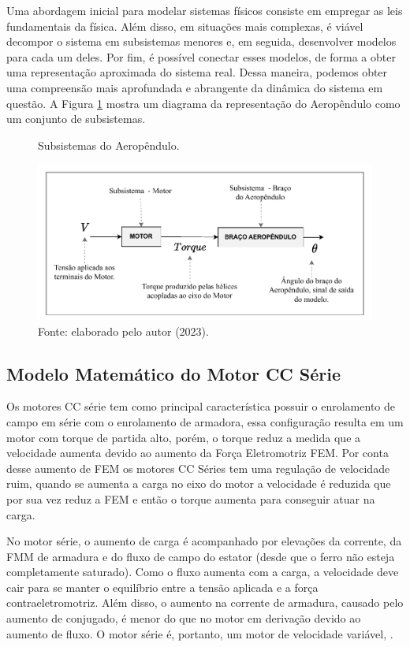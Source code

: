 


Uma abordagem inicial para modelar sistemas físicos consiste em empregar as leis fundamentais da física. Além disso, em situações mais complexas, é viável decompor o sistema em subsistemas menores e, em seguida, desenvolver modelos para cada um deles. Por fim, é possível conectar esses modelos, de forma a obter uma representação aproximada do sistema real. Dessa maneira, podemos obter uma compreensão mais aprofundada e abrangente da dinâmica do sistema em questão. A Figura \ref{fig4:image_01} mostra um diagrama da representação do Aeropêndulo como um conjunto de subsistemas.


\begin{figure}[!h]
	\centering
	\caption{Subsistemas do  Aeropêndulo.}
            \includegraphics[width=1\textwidth]{Capitulos/4_desenvolvimento/4_figuras/subsistemas_aeropendulo.pdf}
	\caption*{Fonte: elaborado pelo autor (2023).}
        \label{fig4:image_01}
\end{figure}


\subsection{Modelo Matemático do Motor CC Série}
\label{modelagem_motorccserie}

Os motores CC série tem como principal característica possuir o enrolamento de campo em série com o enrolamento de armadora, essa configuração resulta em um motor com torque de partida alto, porém, o torque reduz a medida que a velocidade aumenta devido ao aumento da Força Eletromotriz FEM. Por conta desse aumento de FEM os motores CC Séries tem uma regulação de velocidade ruim, quando se aumenta a carga no eixo do motor a velocidade é reduzida que por sua vez reduz a FEM e então o torque aumenta para conseguir atuar na carga.


\begin{citacao}
    No motor série, o aumento de carga é acompanhado por elevações da corrente,
    da FMM de armadura e do fluxo de campo do estator (desde que o ferro não esteja
    completamente saturado). Como o fluxo aumenta com a carga, a velocidade deve cair
    para se manter o equilíbrio entre a tensão aplicada e a força contraeletromotriz. Além
    disso, o aumento na corrente de armadura, causado pelo aumento de conjugado, é
    menor do que no motor em derivação devido ao aumento de fluxo. O motor série
    é, portanto, um motor de velocidade variável, .
\end{citacao}


